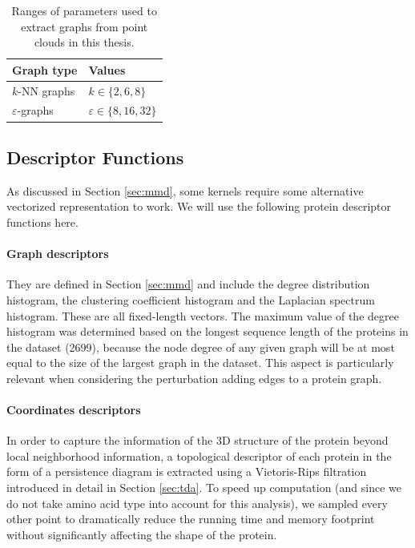\begin{table}
  \centering
  \begin{tabular}{ll}
    \toprule
    \textbf{Graph type} & \textbf{Values} \\
    \midrule
    $k$-NN graphs & $k\in \{2, 6, 8\}$ \\
    $\varepsilon$-graphs & $\varepsilon\in\{8, 16, 32\}$ \\
    \bottomrule
  \end{tabular}
  \caption{Ranges of parameters used to extract graphs from point clouds in this thesis.}
  \label{tab:graph_extraction}
\end{table}


\subsection{Descriptor Functions}\label{sec:descriptors}

As discussed in Section \ref{sec:mmd}, some kernels require some alternative vectorized
representation to work. We will use the following protein descriptor functions
here.


\paragraph{Graph descriptors} They are defined in Section \ref{sec:mmd} and include
  the degree distribution histogram, the clustering coefficient histogram and
  the Laplacian spectrum histogram. These are all fixed-length vectors. The
  maximum value of the degree histogram was determined based on the longest
  sequence length of the proteins in the dataset (2699), because the node degree
  of any given graph will be at most equal to the size of the largest graph in
  the dataset. This aspect is particularly relevant when considering the
  perturbation adding edges to a protein graph.

\paragraph{Coordinates descriptors} In order to capture the information of the
3D structure of the protein beyond local neighborhood information, a topological
descriptor of each protein in the form of a persistence diagram is extracted
using a Vietoris-Rips filtration introduced in detail in Section \ref{sec:tda}.
To speed up computation (and since we do not take amino acid type into account
for this analysis), we sampled every other point to dramatically reduce the
running time and memory footprint without significantly affecting the shape of
the protein. %

